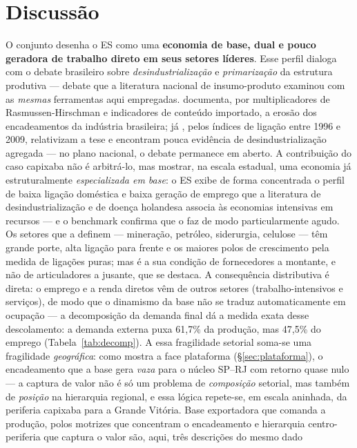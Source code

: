 \documentclass[11pt,a4paper]{article}
\begin{document}
\section{Discussão}
\label{sec:discussao}
O conjunto desenha o ES como uma \textbf{economia de base, dual e pouco geradora de
trabalho direto em seus setores líderes}. Esse perfil dialoga com o debate
brasileiro sobre \emph{desindustrialização} e \emph{primarização} da estrutura produtiva ---
debate que a literatura nacional de insumo-produto examinou com as \emph{mesmas} ferramentas
aqui empregadas. \citet{morceiro2012} documenta, por multiplicadores de Rasmussen-Hirschman e
indicadores de conteúdo importado, a erosão dos encadeamentos da indústria brasileira; já
\citet{nassif2015}, pelos índices de ligação entre 1996 e 2009, relativizam a tese e encontram
pouca evidência de desindustrialização agregada --- no plano nacional, o debate permanece em
aberto. A contribuição do caso capixaba não é arbitrá-lo, mas mostrar, na escala estadual, uma
economia já estruturalmente \emph{especializada em base}: o ES exibe de forma concentrada o
perfil de baixa ligação doméstica e baixa geração de emprego que a literatura de
desindustrialização \citep{oreiro2010} e de doença holandesa \citep{cordenneary1982} associa às
economias intensivas em recursos --- e o benchmark confirma que o faz de modo particularmente agudo. Os setores que a definem --- mineração,
petróleo, siderurgia, celulose --- têm grande porte, alta ligação para frente e os
maiores polos de crescimento pela medida de ligações puras; mas é a sua condição de
fornecedores a montante, e não de articuladores a jusante, que se destaca. A
consequência distributiva é direta: o emprego e a renda diretos vêm de outros setores
(trabalho-intensivos e serviços), de modo que o dinamismo da base não se traduz
automaticamente em ocupação --- a decomposição da demanda final dá a medida exata desse
descolamento: a demanda externa puxa 61,7\% da produção, mas 47,5\% do emprego
(Tabela~\ref{tab:decomp}). A essa fragilidade setorial soma-se uma fragilidade
\emph{geográfica}: como mostra a face plataforma (\S\ref{sec:plataforma}), o encadeamento que
a base gera \emph{vaza} para o núcleo SP--RJ com retorno quase nulo --- a captura de valor não
é só um problema de \emph{composição} setorial, mas também de \emph{posição} na hierarquia
regional, e essa lógica repete-se, em escala aninhada, da periferia capixaba para a Grande Vitória.
Base exportadora que comanda a produção, polos motrizes que concentram o encadeamento e
hierarquia centro-periferia que captura o valor são, aqui, três descrições do mesmo dado
\end{document}
